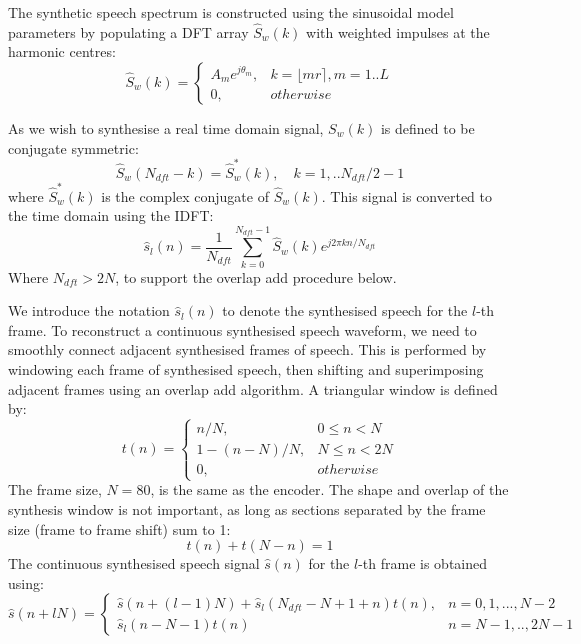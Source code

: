 \documentclass{article}
\begin{document}
The synthetic speech spectrum is constructed using the sinusoidal model parameters by populating a DFT array $\hat{S}_w(k)$ with weighted impulses at the harmonic centres:
\begin{equation}
\hat{S}_w(k) = \begin{cases}
                A_m e^{j\theta_m}, & k = \lfloor m r \rceil, m=1..L \\
                0, & otherwise
                \end{cases}
\end{equation}

As we wish to synthesise a real time domain signal, $S_w(k)$ is defined to be conjugate symmetric:
\begin{equation}
\hat{S}_w(N_{dft}-k) = \hat{S}_w^{*}(k), \quad k = 1,.. N_{dft}/2-1
\end{equation}
where $\hat{S}_w^*(k)$ is the complex conjugate of $\hat{S}_w(k)$. This signal is converted to the time domain
using the IDFT:
\begin{equation}
\label{eq:synth_idft}
\hat{s}_l(n) = \frac{1}{N_{dft}}\sum_{k=0}^{N_{dft}-1} \hat{S}_w(k) e^{j 2 \pi k n / N_{dft}}
\end{equation}
Where $N_{dft} > 2N$, to support the overlap add procedure below.

We introduce the notation $\hat{s}_l(n)$ to denote the synthesised speech for the $l$-th frame. To reconstruct a continuous synthesised speech waveform, we need to smoothly connect adjacent synthesised frames of speech. This is performed by windowing each frame of synthesised speech, then shifting and superimposing adjacent frames using an overlap add algorithm. A triangular window is defined by:
\begin{equation}
t(n) = \begin{cases}
          n/N,         & 0 \le n < N  \\
          1 - (n-N)/N, & N \le n < 2N \\ 
          0,           & otherwise
       \end{cases}
\end{equation}
The frame size, $N=80$, is the same as the encoder. The shape and overlap of the synthesis window is not important, as long as sections separated by the frame size (frame to frame shift) sum to 1:
\begin{equation}
t(n) + t(N-n) = 1
\end{equation}
The continuous synthesised speech signal $\hat{s}(n)$ for the $l$-th frame is obtained using:
\begin{equation}
\hat{s}(n+lN) = \begin{cases}
                    \hat{s}(n+(l-1)N) + \hat{s}_l(N_{dft}-N+1+n)t(n), & n=0,1,...,N-2 \\ 
		            \hat{s}_l(n - N - 1)t(n)                                    & n=N-1,..,2N-1
                  \end{cases}
\end{equation}
\end{document}

